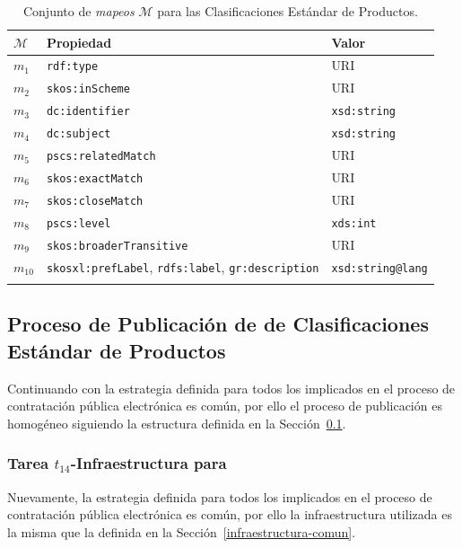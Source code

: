 \begin{longtable}[c]{|p{2cm}|p{8cm}|p{4cm}|} 
\hline
  \textbf{$\mathcal{M}$} &  \textbf{Propiedad} & \textbf{Valor} \\\hline
\endhead
 $m_1$ & \texttt{rdf:type} & \gls{URI} \\ \hline
 $m_2$ & \texttt{skos:inScheme} & URI  \\ \hline
 $m_3$ & \texttt{dc:identifier} & \texttt{xsd:string} \\ \hline
 $m_4$ & \texttt{dc:subject} & \texttt{xsd:string} \\ \hline
 $m_5$ & \texttt{pscs:relatedMatch} & URI  \\ \hline
 $m_6$ & \texttt{skos:exactMatch } & URI \\ \hline
 $m_7$ & \texttt{skos:closeMatch } & URI  \\ \hline
 $m_8$ & \texttt{pscs:level} & \texttt{xds:int} \\ \hline  
 $m_9$ & \texttt{skos:broaderTransitive} & URI \\ \hline
 $m_{10}$ & \texttt{skosxl:prefLabel}, \texttt{rdfs:label}, \texttt{gr:description}  & \texttt{xsd:string@lang} \\ \hline   
\hline
\caption{Conjunto de \textit{mapeos} $\mathcal{M}$ para las Clasificaciones Estándar de Productos.}\label{table:pscs-mappings}\\    
\end{longtable}

\subsection{Proceso de Publicación de \linkeddata de Clasificaciones Estándar de Productos}\label{sect:proceso-publicacion-ld}
Continuando con la estrategia definida para todos los \datasets implicados en el proceso de contratación pública 
electrónica es común, por ello el proceso de publicación es homogéneo siguiendo la estructura definida 
en la Sección~\ref{sect:proceso-publicacion-ld}.

\subsubsection{Tarea $t_{14}$-Infraestructura para \linkeddata}
Nuevamente, la estrategia definida para todos los \datasets implicados en el proceso de contratación pública 
electrónica es común, por ello la infraestructura utilizada es la misma que la definida 
en la Sección~\ref{infraestructura-comun}.

